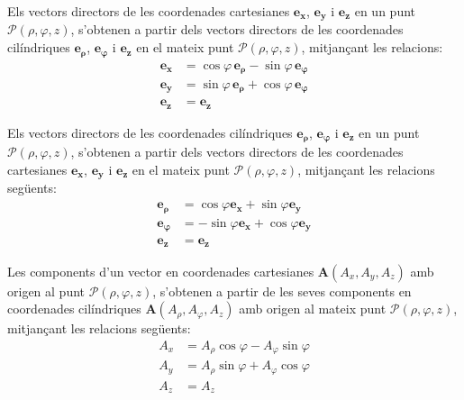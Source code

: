 \documentclass[catalan,a4paper,twoside,11pt]{article}
\begin{document}
Els vectors directors de les coordenades cartesianes  $\boldsymbol{e_x}$, $\boldsymbol{e_y}$ i $\boldsymbol{e_z}$ en un punt $\mathscr{P}(\rho,\varphi,z)$,  s'obtenen a partir dels vectors directors de les coordenades cilíndriques $\boldsymbol{e_\rho}$, $\boldsymbol{e_\varphi}$ i $\boldsymbol{e_z}$ en el mateix punt $\mathscr{P}(\rho,\varphi,z)$, mitjançant les relacions:
\begin{subequations}\begin{align}
		\boldsymbol{e_x} &=\cos\varphi\,\boldsymbol{e_\rho}-\sin\varphi\,\boldsymbol{e_\varphi} \\
		\boldsymbol{e_y} &=\sin\varphi\,\boldsymbol{e_\rho}+\cos\varphi\,\boldsymbol{e_\varphi} \\
		\boldsymbol{e_z} &=\boldsymbol{e_z}
\end{align}\end{subequations}

Els vectors directors de les coordenades cilíndriques  $\boldsymbol{e_\rho}$, $\boldsymbol{e_\varphi}$ i $\boldsymbol{e_z}$ en un punt $\mathscr{P}(\rho,\varphi,z)$, s'obtenen a partir dels vectors directors de les coordenades cartesianes $\boldsymbol{e_x}$, $\boldsymbol{e_y}$ i $\boldsymbol{e_z}$ en el mateix punt $\mathscr{P}(\rho,\varphi,z)$, mitjançant les relacions següents:
\begin{subequations}\begin{align}
    \boldsymbol{e_\rho} &=\cos\varphi\boldsymbol{e_x}+\sin\varphi\boldsymbol{e_y} \\
    \boldsymbol{e_\varphi} &=-\sin\varphi\boldsymbol{e_x}+\cos\varphi\boldsymbol{e_y} \\
    \boldsymbol{e_z} &=\boldsymbol{e_z}
\end{align}\end{subequations}


Les components d'un vector en coordenades cartesianes $\boldsymbol{A}(A_x, A_y, A_z)$ amb origen al punt $\mathscr{P}(\rho,\varphi,z)$, s'obtenen a partir de les seves components en coordenades cilíndriques $\boldsymbol{A}(A_\rho, A_\varphi, A_z)$ amb origen al mateix punt $\mathscr{P}(\rho,\varphi,z)$, mitjançant les relacions següents:
\begin{subequations}\begin{align}
    A_x &=A_\rho \cos\varphi -A_\varphi\sin\varphi \\
    A_y &=A_\rho\sin\varphi +A_\varphi\cos\varphi\\
    A_z &= A_z
\end{align}\end{subequations}
\end{document}

